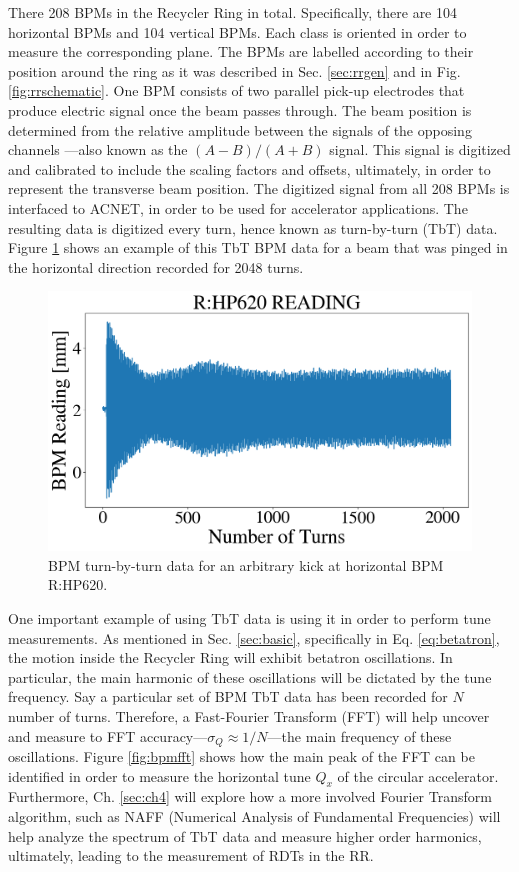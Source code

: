 There 208 BPMs in the Recycler Ring in total. Specifically, there are 104 horizontal BPMs and 104 vertical BPMs. Each class is oriented in order to measure the corresponding plane. The BPMs are labelled according to their position around the ring as it was described in Sec. \ref{sec:rrgen} and in Fig. \ref{fig:rrschematic}. One BPM consists of two parallel pick-up electrodes that produce electric signal once the beam passes through. The beam position is determined from the relative amplitude between the signals of the opposing channels \cite{rrbpms}---also known as the $(A-B)/(A+B)$ signal. This signal is digitized and calibrated to include the scaling factors and offsets, ultimately, in order to represent the transverse beam position. The digitized signal from all 208 BPMs is interfaced to ACNET, in order to be used for accelerator applications. The resulting data is digitized every turn, hence known as turn-by-turn (TbT) data. Figure \ref{fig:bpmkick} shows an example of this TbT BPM data for a beam that was pinged in the horizontal direction recorded for 2048 turns.      

\begin{figure}[H]
   \centering
   \includegraphics[width=\columnwidth]{chapter3/bpm_kick.png}
   \caption{BPM turn-by-turn data for an arbitrary kick at horizontal BPM R:HP620.}
   \label{fig:bpmkick}
\end{figure}

One important example of using TbT data is using it in order to perform tune measurements. As mentioned in Sec. \ref{sec:basic}, specifically in Eq. \ref{eq:betatron}, the motion inside the Recycler Ring will exhibit betatron oscillations. In particular, the main harmonic of these oscillations will be dictated by the tune frequency. Say a particular set of BPM TbT data has been recorded for $N$ number of turns. Therefore, a Fast-Fourier Transform (FFT) will help uncover and measure to FFT accuracy---$\sigma_Q\approx 1/N $---the main frequency of these oscillations. Figure \ref{fig:bpmfft} shows how the main peak of the FFT can be identified in order to measure the horizontal tune $Q_x$ of the circular accelerator. Furthermore, Ch. \ref{sec:ch4} will explore how a more involved Fourier Transform algorithm, such as NAFF (Numerical Analysis of Fundamental Frequencies) will help analyze the spectrum of TbT data and measure higher order harmonics, ultimately, leading to the measurement of RDTs in the RR.     

